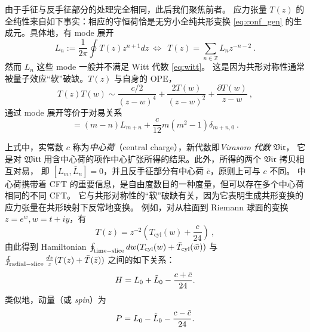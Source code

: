 \documentclass[11pt,a4paper,fontset=windows]{ctexart}
\numberwithin{equation}{section}
\newcommand{\ZZ}{\mathbb{Z}}
\newcommand{\vir}{\mathfrak{Vir}}
\newcommand{\witt}{\mathfrak{Witt}}
\newcommand{\be}{\begin{equation}}
\newcommand{\ee}{\end{equation}}
\begin{document}
由于手征与反手征部分的处理完全相同，此后我们聚焦前者。
应力张量 $T(z)$ 的全纯性来自如下事实：相应的守恒荷恰是无穷小全纯共形变换
\eqref{eq:conf_gen} 的生成元。具体地，有 mode 展开
\begin{equation}
L_n:=\frac{1}{2\pi}\oint T(z) z^{n+1} dz~\Leftrightarrow~~T(z)=\sum_{n\in\ZZ}L_n z^{-n-2}~.
\end{equation}
然而 $L_n$ 这些 mode 一般并不满足 Witt 代数 \eqref{eq:witt}。
这是因为共形对称性通常被量子效应“软”破缺。$T(z)$ 与自身的 OPE，
\begin{equation}
T(z)T(w)\sim\frac{c/2}{(z-w)^4}+\frac{2T(w)}{(z-w)^2}+\frac{\partial T(w)}{z-w}~, 
\end{equation}
通过 mode 展开等价于对易关系
\begin{equation}
[L_m,L_n]=(m-n)L_{m+n}+\frac{c}{12}m(m^2-1)\delta_{m+n,0}~.
\end{equation}


上式中，实常数 $c$ 称为\emph{中心荷}（central charge），新代数即\emph{Virasoro 代数} $\vir$，
它是对 $\witt$ 用含中心荷的项作中心扩张所得的结果。此外，所得的两个 $\vir$ 拷贝相互对易，
即 $[L_m,\bar{L}_n]=0$，并且反手征部分有中心荷 $\bar{c}$，原则上可与 $c$ 不同。
中心荷携带着 CFT 的重要信息，是自由度数目的一种度量，但可以存在多个中心荷相同的不同 CFT。
它与共形对称性的“软”破缺有关，因为它表明生成共形变换的应力张量在共形映射下反常地变换。
例如，对从柱面到 Riemann 球面的变换 $z=e^w, w=t+iy$，有
\begin{equation}
T(z)=z^{-2}\left(T_{\text{cyl}}(w)+\frac{c}{24}\right)~, 
\end{equation}
由此得到 Hamiltonian $\oint_{\rm{time-slice}}dw ( T_{\text{cyl}}(w)+ \bar {T}_{\text{cyl}}(\bar w))$
与 $\oint_{\rm{radial-slice}}{dz\over z}( T(z)+ \bar {T}(\bar z)) $ 之间的如下关系：
\be\label{hamiltonian}
H= L_0  +  \tilde L_0 - {c+\tilde c \over 24}. 
\ee
类似地，动量（或 {\em spin}）为
\be\label{momentum}
P= L_0  -  \tilde L_0 - {c-\tilde c \over 24}. 
\ee

\end{document}
